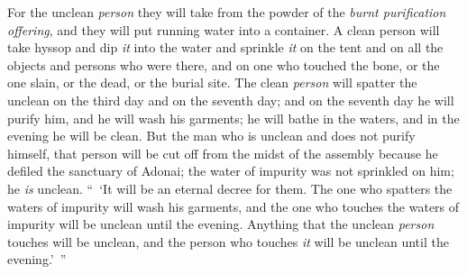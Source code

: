 \begin{biblechapter}
\verse For the unclean \textit{person} they will take from the powder of the \textit{burnt purification offering}, and they will put running water into a container.
\verse A clean person will take hyssop and dip \textit{it} into the water and sprinkle \textit{it} on the tent and on all the objects and persons who were there, and on one who touched the bone, or the one slain, or the dead, or the burial site.
\verse The clean \textit{person} will spatter the unclean on the third day and on the seventh day; and on the seventh day he will purify him, and he will wash his garments; he will bathe in the waters, and in the evening he will be clean.
\verse But the man who is unclean and does not purify himself, that person will be cut off from the midst of the assembly because he defiled the sanctuary of Adonai; the water of impurity was not sprinkled on him; he \textit{is} unclean.
\verse “ ‘It will be an eternal decree for them. The one who spatters the waters of impurity will wash his garments, and the one who touches the waters of impurity will be unclean until the evening.
\verse Anything that the unclean \textit{person} touches will be unclean, and the person who touches \textit{it} will be unclean until the evening.’ ”
\end{biblechapter}

